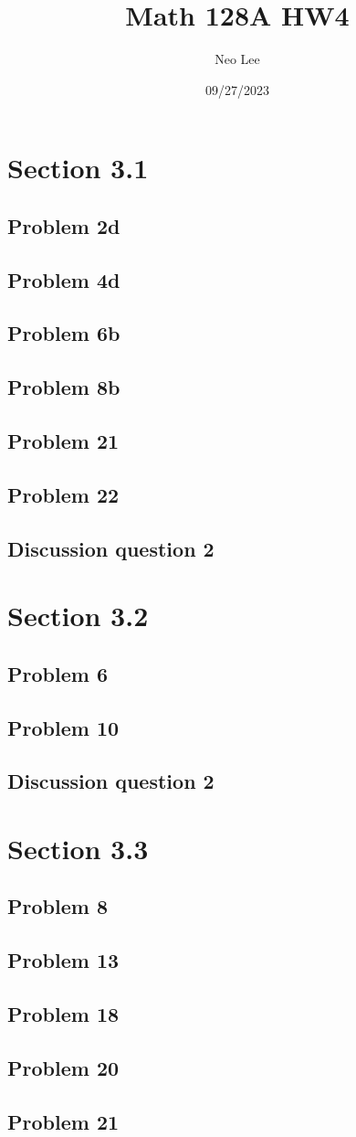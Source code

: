 \documentclass{article}
\title{Math 128A HW4}
\author{Neo Lee}
\date{09/27/2023}
\begin{document}
 

\maketitle 

\section*{Section 3.1}
\subsection*{Problem 2d}
\subsection*{Problem 4d}
\subsection*{Problem 6b}
\subsection*{Problem 8b}
\subsection*{Problem 21}
\subsection*{Problem 22}
\subsection*{Discussion question 2}
\section*{Section 3.2}
\subsection*{Problem 6}
\subsection*{Problem 10}
\subsection*{Discussion question 2}
\section*{Section 3.3}
\subsection*{Problem 8}
\subsection*{Problem 13}
\subsection*{Problem 18}
\subsection*{Problem 20}
\subsection*{Problem 21}
\end{document}
